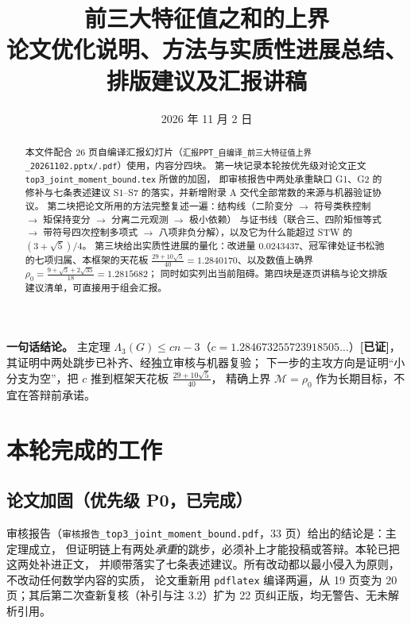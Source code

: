 \documentclass[UTF8,11pt]{ctexart}
\title{\bfseries 前三大特征值之和的上界\\[4pt]
\large 论文优化说明、方法与实质性进展总结、排版建议及汇报讲稿}
\author{}
\date{2026 年 11 月 2 日}
\newcommand{\Lam}{\Lambda}
\newcommand{\M}{\mathcal{M}}
\newcommand{\file}[1]{\texttt{#1}}
\newcommand{\ok}{\textcolor[rgb]{0.05,0.45,0.15}{\bfseries [已证]}}
\begin{document}
\maketitle
\vspace{-1.5em}

\begin{abstract}
\noindent 本文件配合 26 页自编译汇报幻灯片（\file{汇报PPT\_自编译\_前三大特征值上界\_20261102.pptx/.pdf}）使用，内容分四块。
第一块记录本轮按优先级对论文正文 \file{top3\_joint\_moment\_bound.tex} 所做的加固，
即审核报告中两处承重缺口 G1、G2 的修补与七条表述建议 S1--S7 的落实，并新增附录 A 交代全部常数的来源与机器验证协议。
第二块把论文所用的方法完整复述一遍：结构线（二阶变分 $\to$ 符号类秩控制 $\to$ 矩保持变分 $\to$ 分离二元观测 $\to$ 极小依赖）
与证书线（联合三、四阶矩恒等式 $\to$ 带符号四次控制多项式 $\to$ 八项非负分解），以及它为什么能超过 STW 的 $(3+\sqrt5)/4$。
第三块给出实质性进展的量化：改进量 $0.0243437$、冠军律处证书松驰的七项归属、本框架的天花板
$\frac{29+10\sqrt5}{40}=1.2840170$、以及数值上确界 $\rho_0=\frac{9+\sqrt5+2\sqrt{35}}{18}=1.2815682$；
同时如实列出当前阻碍。第四块是逐页讲稿与论文排版建议清单，可直接用于组会汇报。
\end{abstract}

\vspace{-0.5em}
\noindent\textbf{一句话结论。}
主定理 $\Lam_3(G)\le cn-3$（$c=1.284673255723918505\ldots$）\ok，其证明中两处跳步已补齐、经独立审核与机器复验；
下一步的主攻方向是证明``小分支为空''，把 $c$ 推到框架天花板 $\frac{29+10\sqrt5}{40}$，
精确上界 $\M=\rho_0$ 作为长期目标，不宜在答辩前承诺。

\tableofcontents
\newpage

\section{本轮完成的工作}

\subsection{论文加固（优先级 P0，已完成）}

审核报告（\file{审核报告\_top3\_joint\_moment\_bound.pdf}，33 页）给出的结论是：主定理成立，
但证明链上有两处\emph{承重}的跳步，必须补上才能投稿或答辩。本轮已把这两处补进正文，
并顺带落实了七条表述建议。所有改动都以最小侵入为原则，不改动任何数学内容的实质，
论文重新用 \file{pdflatex} 编译两遍，从 19 页变为 20 页；其后第二次查新复核（补引与注 3.2）扩为 22 页纠正版，均无警告、无未解析引用。
\end{document}
